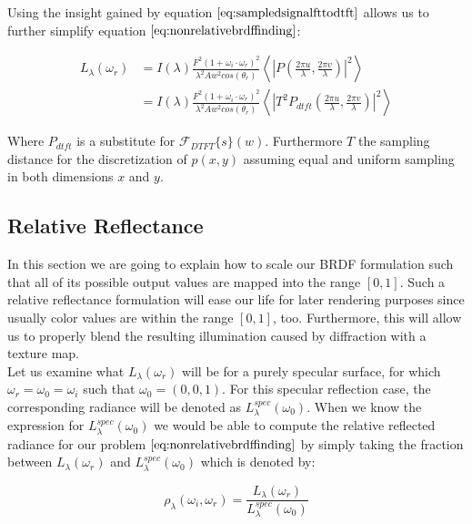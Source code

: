 Using the insight gained by equation $\ref{eq:sampledsignalfttodtft}$ allows us to further simplify equation $\ref{eq:nonrelativebrdffinding}$:

\begin{align}
L_{\lambda}(\omega_r) 
& = I(\lambda) \frac{F^2 (1 + \omega_i \cdot \omega_r)^2}{\lambda^2 A w^2 cos(\theta_r)} \left \langle \left|P \left( \frac{2\pi u}{\lambda}, \frac{2\pi v}{\lambda}\right) \right|^2 \right \rangle \nonumber \\
& = I(\lambda) \frac{F^2 (1 + \omega_i \cdot \omega_r)^2}{\lambda^2 A w^2 cos(\theta_r)} \left \langle \left|T^2 P_{dtft}\left( \frac{2\pi u}{\lambda}, \frac{2\pi v}{\lambda}\right) \right|^2 \right \rangle
\label{eq:nonrelativebrdffindingreproddtft}
\end{align}

Where $P_{dtft}$ is a substitute for $\mathcal{F}_{DTFT}\{s\}(w)$. Furthermore $T$ the sampling distance for the discretization of $p(x,y)$ assuming equal and uniform sampling in both dimensions $x$ and $y$.

\subsection{Relative Reflectance}
\label{sec:relrefl}
In this section we are going to explain how to scale our BRDF formulation such that all of its possible output values are mapped into the range $\left[0,1\right]$. Such a relative reflectance formulation will ease our life for later rendering purposes since usually color values are within the range $\left[0,1\right]$, too. Furthermore, this will allow us to properly blend the resulting illumination caused by diffraction with a texture map. \\

Let us examine what $L_\lambda(\omega_r)$ will be for a purely specular surface, for which $\omega_r = \omega_0 = \omega_i$ such that $\omega_0 = (0,0,1)$. For this specular reflection case, the corresponding radiance will be denoted as $L_\lambda^{spec}(\omega_0)$. When we know the expression for $L_\lambda^{spec}(\omega_0)$ we would be able to compute the relative reflected radiance for our problem $\ref{eq:nonrelativebrdffinding}$ by simply taking the fraction between $L_\lambda(\omega_r)$ and $L_\lambda^{spec}(\omega_0)$ which is denoted by: 

\begin{equation}
  \rho_\lambda(\omega_i,\omega_r) = \frac{L_\lambda(\omega_r)}{L_\lambda^{spec}(\omega_0)}
  \label{eq:rohrel}
\end{equation}


